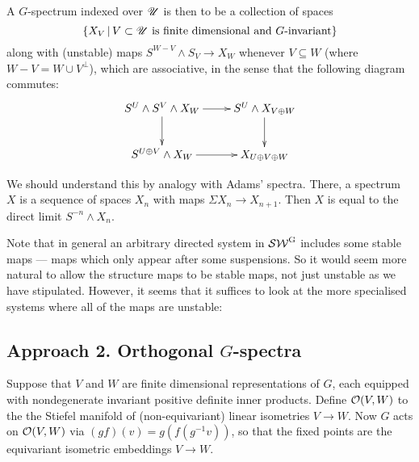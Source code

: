 \documentclass[11pt]{article}
\begin{document}
\begin{FirstNineLectures}
\begin{defn*}
A $G$-spectrum indexed over $\mathscr{U}$ is then to be a collection of spaces 
\[\{X_V\,|\,V\subset\mathscr{U}\text{ is finite dimensional and $G$-invariant}\}\]
along with (unstable) maps $S^{W-V}\wedge S_V\to X_W$ whenever $V\subseteq W$ (where $W-V=W\cup V^\perp$), which are associative, in the sense that the following diagram commutes:
\[\xymatrix{
\ar[d]S^U\wedge S^V\wedge X_W\ar[r]&S^U\wedge X_{V\oplus W}\ar[d]\\
S^{U\oplus V}\wedge X_W\ar[r]&X_{U\oplus V\oplus W}
}\]
\end{defn*}
We should understand this by analogy with Adams' spectra. There, a spectrum $X$ is a sequence of spaces $X_n$ with maps $\Sigma X_n\to X_{n+1}$. Then $X$ is equal to the direct limit $S^{-n}\wedge X_n$.

Note that in general an arbitrary directed system in $\operatorname{{\mathcal{SW}^G}}$ includes some stable maps --- maps which only appear after some suspensions. So it would seem more natural to allow the structure maps to be stable maps, not just unstable as we have stipulated. However, it seems that it suffices to look at the more specialised systems where all of the maps are unstable:
\subsection*{Approach 2. Orthogonal $G$-spectra}
Suppose that $V$ and $W$ are finite dimensional representations of $G$, each equipped with nondegenerate invariant positive definite inner products. Define $\mathcal{O}(V,W)$ to the the Stiefel manifold of (non-equivariant) linear isometries $V\to W$. Now $G$ acts on $\mathcal{O}(V,W)$ via $(gf)(v)=g(f(g^{-1}v))$, so that the fixed points are the equivariant isometric embeddings $V\to W$.


\end{FirstNineLectures}
\end{document}
